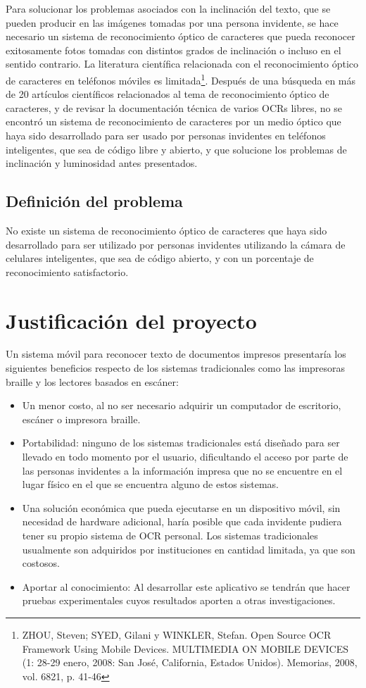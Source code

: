 \documentclass[a4paper, 11pt, oneside]{report}
\begin{document}
Para solucionar los problemas asociados con la inclinación del texto, que se pueden producir en las imágenes tomadas por una persona invidente, se hace necesario un sistema de reconocimiento óptico de caracteres que pueda reconocer exitosamente fotos tomadas con distintos grados de inclinación o incluso en el sentido contrario.
La literatura científica relacionada con el reconocimiento óptico de caracteres en teléfonos móviles es limitada\footnote{ZHOU, Steven; SYED, Gilani y WINKLER, Stefan. Open Source OCR Framework Using Mobile Devices. MULTIMEDIA ON MOBILE DEVICES (1: 28-29 enero, 2008: San José, California, Estados Unidos). Memorias, 2008, vol. 6821, p. 41-46}. Después de una búsqueda en más de 20 artículos científicos relacionados al tema de reconocimiento óptico de caracteres, y de revisar la documentación técnica de varios OCRs libres, no se encontró un sistema de reconocimiento de caracteres por un medio óptico que haya sido desarrollado para ser usado por personas invidentes en teléfonos inteligentes, que sea de código libre y abierto, y que solucione los problemas de inclinación y luminosidad antes presentados.
\subsection{Definición del problema}
No existe un sistema de reconocimiento óptico de caracteres que haya sido desarrollado para ser utilizado por personas invidentes utilizando la cámara de celulares inteligentes, que sea de código abierto, y con un porcentaje de reconocimiento satisfactorio.
\section{Justificación del proyecto}
Un sistema móvil para reconocer texto de documentos impresos presentaría los siguientes beneficios respecto de los sistemas tradicionales como las impresoras braille y los lectores basados en escáner:
\begin{itemize} 
\item Un menor costo, al no ser necesario adquirir un computador de escritorio, escáner o impresora braille.
\item Portabilidad: ninguno de los sistemas tradicionales está diseñado para ser llevado en todo momento por el usuario, dificultando el acceso por parte de las personas invidentes a la información impresa que no se encuentre en el lugar físico en el que se encuentra alguno de estos sistemas.
\item Una solución económica que pueda ejecutarse en un dispositivo móvil, sin necesidad de hardware adicional, haría posible que cada invidente pudiera tener su propio sistema de OCR personal. Los sistemas tradicionales usualmente son adquiridos por instituciones en cantidad limitada, ya que son costosos.
\item Aportar al conocimiento: Al desarrollar este aplicativo se tendrán que hacer pruebas experimentales cuyos resultados aporten a otras investigaciones.
\end{itemize}
\end{document}
